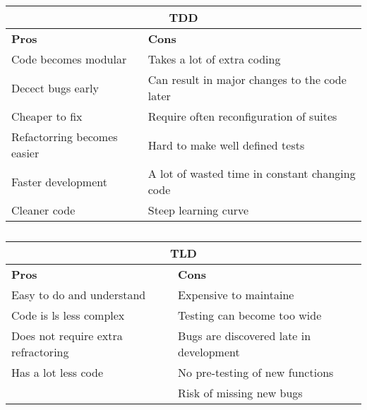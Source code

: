 \begin{table}[h]    
  
    \begin{tabular}{|l|l|}       
        \hline
        \multicolumn{2}{|c|}{TDD} \\
        \hline
        \textbf{Pros} & \textbf{Cons}  \\ \hline
        Code becomes modular &  Takes a lot of extra coding  \\ 
        Decect bugs early & Can result in major changes to the code later   \\ 
        Cheaper to fix &  Require often reconfiguration of suites  \\
        Refactorring becomes easier &  Hard to make well defined tests  \\      
        Faster development &  A lot of wasted time in constant changing code \\ 
        Cleaner code &  Steep learning curve  \\   
        \hline
    \end{tabular}
    \caption{} 
    \label{table: procons1}
\end{table} 
  
\begin{table}[h] 
      \begin{tabular}{|l|l|}
        \hline
        \multicolumn{2}{|c|}{TLD} \\
        \hline
        \textbf{Pros} & \textbf{Cons}  \\ \hline
        Easy to do and understand &  Expensive to maintaine  \\ 
        Code is ls less complex & Testing can become too wide  \\ 
        Does not require extra refractoring &  Bugs are discovered late in development  \\
        Has a lot less code & No pre-testing of new functions  \\  
        & Risk of missing new bugs  \\  \hline
    
    \end{tabular}
    \caption{}  
    \label{table: procons2}
    \end{table}
